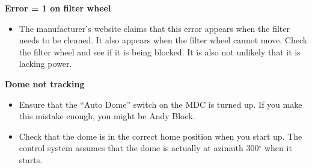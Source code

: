 \documentclass[letterpaper, 12pt]{report}
\begin{document}
\noindent\textbf{Error = 1 on filter wheel}
\begin{itemize}
	\item The manufacturer's website claims that this error appears when the filter needs to be cleaned. It also appears when the filter wheel cannot move. Check the filter wheel and see if it is being blocked. It is also not unlikely that it is lacking power.
\end{itemize}
\noindent \textbf{Dome not tracking}
\begin{itemize}
	\item Ensure that the ``Auto Dome'' switch on the MDC is turned up. If you make this mistake enough, you might be Andy Block.
	\item Check that the dome is in the correct home position when you start up. The control system assumes that the dome is actually at azimuth 300$^\circ$ when it starts.
\end{itemize}



\end{document}
